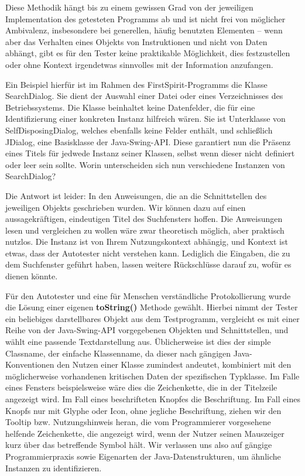 Diese Methodik hängt bis zu einem gewissen Grad von der jeweiligen Implementation 
des getesteten Programms ab und ist nicht frei von möglicher Ambivalenz,
insbesondere bei generellen, häufig benutzten Elementen -- wenn aber
das Verhalten eines Objekts von Instruktionen und nicht von Daten abhängt,
gibt es für den Tester keine praktikable Möglichkeit, dies festzustellen
oder ohne Kontext irgendetwas sinnvolles mit der Information anzufangen.

Ein Beispiel hierfür ist im Rahmen des FirstSpirit-Programms die Klasse
\glqq{}SearchDialog\grqq{}. Sie dient der Auswahl einer Datei oder eines Verzeichnisses
des Betriebssystems. Die Klasse beinhaltet keine Datenfelder, die für
eine Identifizierung einer konkreten Instanz hilfreich wären. Sie ist
Unterklasse von \glqq{}SelfDisposingDialog\grqq{}, welches ebenfalls keine Felder
enthält, und schließlich \glqq{}JDialog\grqq{}, eine Basisklasse der Java-Swing-API.
Diese garantiert nun die Präsenz eines Titels für jedwede Instanz
seiner Klassen, selbst wenn dieser nicht definiert oder leer sein sollte.
Worin unterscheiden sich nun verschiedene Instanzen von \glqq{}SearchDialog\grqq{}?

Die Antwort ist leider: In den Anweisungen, die an die Schnittstellen
des jeweiligen Objekts geschrieben wurden. Wir können dazu auf einen
aussagekräftigen, eindeutigen Titel des Suchfensters hoffen. Die
Anweisungen lesen und vergleichen zu wollen wäre zwar theoretisch
möglich, aber praktisch nutzlos. Die Instanz ist von Ihrem Nutzungskontext
abhängig, und Kontext ist etwas, dass der Autotester nicht verstehen kann.
Lediglich die Eingaben, die zu dem Suchfenster geführt haben,
lassen weitere Rückschlüsse darauf zu, wofür es dienen könnte.

Für den Autotester und eine für Menschen verständliche Protokollierung
wurde die Lösung einer eigenen \textbf{toString()} Methode gewählt.
Hierbei nimmt der Tester ein beliebiges darstellbares Objekt aus dem Testprogramm,
vergleicht es mit einer Reihe von der Java-Swing-API vorgegebenen
Objekten und Schnittstellen, und wählt eine passende Textdarstellung aus.
Üblicherweise ist dies der \glqq{}simple Classname\grqq{}, der einfache Klassenname,
da dieser nach gängigen Java-Konventionen den Nutzen einer Klasse zumindest
andeutet, kombiniert mit den möglicherweise vorhandenen kritischen Daten
der spezifischen Typklasse. Im Falle eines Fensters beispielsweise wäre
dies die Zeichenkette, die in der Titelzeile angezeigt wird. Im Fall
eines beschrifteten Knopfes die Beschriftung. Im Fall eines Knopfs
nur mit Glyphe oder Icon, ohne jegliche Beschriftung, 
ziehen wir den \glqq{}Tooltip\grqq{} bzw. Nutzungshinweis heran,
die vom Programmierer vorgesehene helfende Zeichenkette, die angezeigt
wird, wenn der Nutzer seinen Mauszeiger kurz über das betreffende Symbol hält.
Wir verlassen uns also auf gängige Programmierpraxis sowie Eigenarten der 
Java-Datenstrukturen, um ähnliche Instanzen zu identifizieren.

